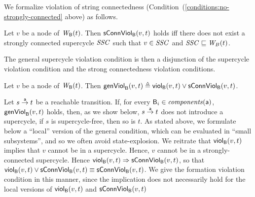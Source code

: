 
We formalize violation of string connectedness (Condition~(\ref{conditions:no-strongly-connected} above)
as follows.

\begin{definition}
\label{def:sConn.violation}
 Let $v$ be a node of $\wfg{\B}{t}$.   Then $\connViol{v}{t}$ holds iff there does not exist a 
strongly connected supercycle $\SSC$ such that $v \in \SSC$ and $\SSC \subg \wfg{B}{t}$.
\end{definition}



The general supercycle violation condition is then a disjunction of the supercycle violation condition
and the strong connectedness violation conditions.


\begin{definition}
\label{def:formation.violation} 
\label{defn:formation.violation} 
Let $v$ be a node of $\wfg{\B}{t}$.
Then 
$\genViol{v}{t}  \df \scV{v}{t}  \lor \connViol{v}{t}$.
\end{definition}
%
Let $s \goesto[\act] t$ be a reachable transition. If, for every $\B_i \in \cmps{\act}$, $\formViol{v}{t}$ holds, then, as we show below,
$s \goesto[\act] t$ does not introduce a supercycle, \ie if $s$ is supercycle-free, then so is $t$. As stated above, we formulate below a ``local''
version of the general condition, which can be evaluated in ``small subsystems'', and so we often avoid state-explosion.
%
%
We reitrate that $\scV{v}{t}$ implies that $v$ cannot be in a supercycle. Hence, $v$ cannot be in a strongly-connected supercycle.
Hence $\scV{v}{t} \imp \connViol{v}{t}$, so that 
$\scV{v}{t}  \lor \connViol{v}{t} \ev  \connViol{v}{t}$.
We give the formation violation condition in this manner, since 
the implication does not necessarily hold for the local versions of $\scV{v}{t}$ and $\connViol{v}{t}$



